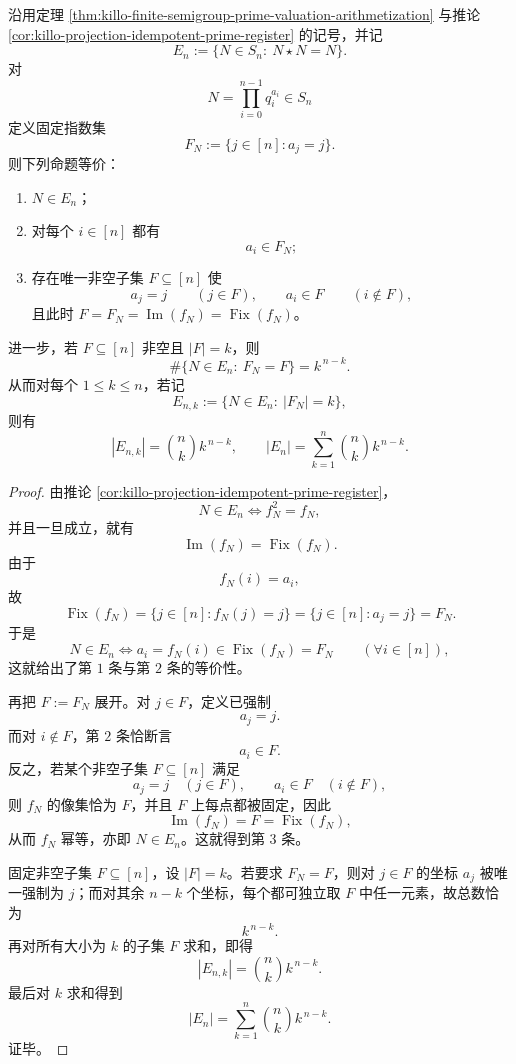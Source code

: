 \begin{theorem}[素数寄存器幂等元的固定指数分层与完全计数]\label{thm:xi-prime-register-idempotent-fixed-index-stratification}
沿用定理 \ref{thm:killo-finite-semigroup-prime-valuation-arithmetization} 与推论 \ref{cor:killo-projection-idempotent-prime-register} 的记号，并记
\[
E_n:=\{N\in S_n:\ N\star N=N\}.
\]
对
\[
N=\prod_{i=0}^{n-1}q_i^{a_i}\in S_n
\]
定义固定指数集
\[
F_N:=\{j\in[n]:a_j=j\}.
\]
则下列命题等价：
\begin{enumerate}
  \item \(N\in E_n\)；
  \item 对每个 \(i\in[n]\) 都有
  \[
  a_i\in F_N;
  \]
  \item 存在唯一非空子集 \(F\subseteq[n]\) 使
  \[
  a_j=j\qquad (j\in F),
  \qquad
  a_i\in F\qquad (i\notin F),
  \]
  且此时 \(F=F_N=\operatorname{Im}(f_N)=\operatorname{Fix}(f_N)\)。
\end{enumerate}
进一步，若 \(F\subseteq[n]\) 非空且 \(|F|=k\)，则
\[
\boxed{\;
\#\{N\in E_n:\ F_N=F\}=k^{\,n-k}.\;}
\]
从而对每个 \(1\le k\le n\)，若记
\[
E_{n,k}:=\{N\in E_n:\ |F_N|=k\},
\]
则有
\[
\boxed{\;
|E_{n,k}|=\binom{n}{k}k^{\,n-k},
\qquad
|E_n|=\sum_{k=1}^{n}\binom{n}{k}k^{\,n-k}.\;}
\]
\end{theorem}
\begin{proof}
由推论 \ref{cor:killo-projection-idempotent-prime-register}，
\[
N\in E_n
\iff
f_N^2=f_N,
\]
并且一旦成立，就有
\[
\operatorname{Im}(f_N)=\operatorname{Fix}(f_N).
\]
由于
\[
f_N(i)=a_i,
\]
故
\[
\operatorname{Fix}(f_N)=\{j\in[n]:f_N(j)=j\}=\{j\in[n]:a_j=j\}=F_N.
\]
于是
\[
N\in E_n
\iff
a_i=f_N(i)\in \operatorname{Fix}(f_N)=F_N
\qquad
(\forall i\in[n]),
\]
这就给出了第 \(1\) 条与第 \(2\) 条的等价性。

再把 \(F:=F_N\) 展开。对 \(j\in F\)，定义已强制
\[
a_j=j.
\]
而对 \(i\notin F\)，第 \(2\) 条恰断言
\[
a_i\in F.
\]
反之，若某个非空子集 \(F\subseteq[n]\) 满足
\[
a_j=j\quad (j\in F),
\qquad
a_i\in F\quad (i\notin F),
\]
则 \(f_N\) 的像集恰为 \(F\)，并且 \(F\) 上每点都被固定，因此
\[
\operatorname{Im}(f_N)=F=\operatorname{Fix}(f_N),
\]
从而 \(f_N\) 幂等，亦即 \(N\in E_n\)。这就得到第 \(3\) 条。

固定非空子集 \(F\subseteq[n]\)，设 \(|F|=k\)。若要求 \(F_N=F\)，则对 \(j\in F\) 的坐标 \(a_j\) 被唯一强制为 \(j\)；而对其余 \(n-k\) 个坐标，每个都可独立取 \(F\) 中任一元素，故总数恰为
\[
k^{\,n-k}.
\]
再对所有大小为 \(k\) 的子集 \(F\) 求和，即得
\[
|E_{n,k}|=\binom{n}{k}k^{\,n-k}.
\]
最后对 \(k\) 求和得到
\[
|E_n|=\sum_{k=1}^{n}\binom{n}{k}k^{\,n-k}.
\]
证毕。
\end{proof}

